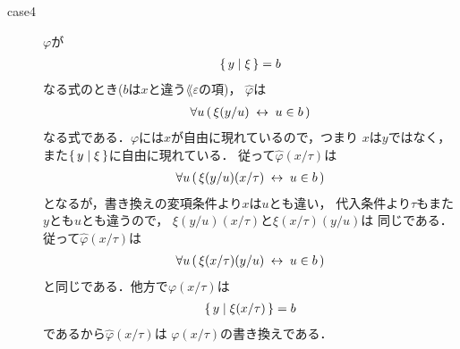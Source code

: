 \begin{metaprf}[第一]
\begin{description}
\begin{description}
					\item[case4] $\varphi$が
						\begin{align}
							\{\, y \mid \xi\, \} = b
						\end{align}
						なる式のとき($b$は$x$と違う$\lang{\varepsilon}$の項)，
						$\widehat{\varphi}$は
						\begin{align}
							\forall u\, (\, \xi(y/u) \hspace{0.25em}\leftrightarrow\hspace{0.25em} u \in b\, )
						\end{align}
						なる式である．$\varphi$には$x$が自由に現れているので，つまり
						$x$は$y$ではなく，また$\{\, y \mid \xi\, \}$に自由に現れている．
						従って$\widehat{\varphi}(x/\tau)$は
						\begin{align}
							\forall u\, (\, \xi(y/u)(x/\tau) \hspace{0.25em}\leftrightarrow\hspace{0.25em} u \in b\, )
						\end{align}
						となるが，書き換えの変項条件より$x$は$u$とも違い，
						代入条件より$\tau$もまた$y$とも$u$とも違うので，
						$\xi(y/u)(x/\tau)$と$\xi(x/\tau)(y/u)$は
						同じである．従って$\widehat{\varphi}(x/\tau)$は
						\begin{align}
							\forall u\, (\, \xi(x/\tau)(y/u) \hspace{0.25em}\leftrightarrow\hspace{0.25em} u \in b\, )
						\end{align}
						と同じである．他方で$\varphi(x/\tau)$は
						\begin{align}
							\{\, y \mid \xi(x/\tau)\, \} = b
						\end{align}
						であるから$\widehat{\varphi}(x/\tau)$は
						$\varphi(x/\tau)$の書き換えである．
					

\end{description}
\end{description}
\end{metaprf}
